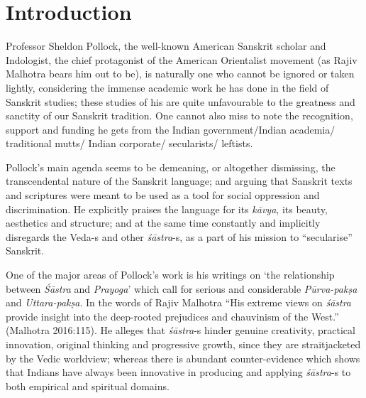 \vskip -12pt

\section*{Introduction}

Professor Sheldon Pollock, the well-known American Sanskrit scholar and Indologist, the chief protagonist of the American Orientalist movement (as Rajiv Malhotra bears him out to be), is naturally one who cannot be ignored or taken lightly, considering the immense academic work he has done in the field of Sanskrit studies; these studies of his are quite unfavourable to the greatness and sanctity of our Sanskrit tradition. One cannot also miss to note the recognition, support and funding he gets from the Indian government/Indian academia/ traditional mutts/ Indian corporate/ secularists/ leftists.

Pollock's main agenda seems to be demeaning, or altogether dismissing, the transcendental nature of the Sanskrit language; and arguing that Sanskrit texts and scriptures were meant to be used as a tool for social oppression and discrimination. He explicitly praises the language for its {\sl kāvya}, its beauty, aesthetics and structure; and at the same time constantly and implicitly disregards the Veda-s and other {\sl śāstra}-s, as a part of his mission to ``secularise'' Sanskrit. 

One of the major areas of Pollock's work is his writings on `the relationship between {\sl Śāstra} and {\sl Prayoga}' which call for serious and considerable {\sl Pūrva-pakṣa} and {\sl Uttara-pakṣa}. In the words of Rajiv Malhotra ``His extreme views on {\sl śāstra} provide insight into the deep-rooted prejudices and chauvinism of the West.'' (Malhotra 2016:115). He alleges that {\sl śāstra}-s hinder genuine creativity, practical innovation, original thinking and progressive growth, since they are straitjacketed by the Vedic worldview; whereas there is abundant counter-evidence which shows that Indians have always been innovative in producing and applying {\sl śāstra}-s to both empirical and spiritual domains.

